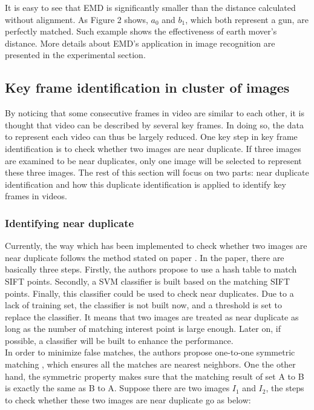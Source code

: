 \noindent It is easy to see that EMD is significantly smaller than the distance calculated without alignment. As Figure 2 shows, $a_0$ and $b_1$, which both represent a gun, are perfectly matched. Such example shows the effectiveness of earth mover's distance. More details about EMD's application in image recognition are presented in the experimental section.

\subsection {Key frame identification in cluster of images}
By noticing that some consecutive frames in video are similar to each other, it is thought that video can be described by several key frames. In doing so, the data to represent each video can thus be largely reduced. One key step in key frame identification is to check whether two images are near duplicate. If three images are examined to be near duplicates, only one image will be selected to represent these three images. The rest of this section will focus on two parts: near duplicate identification and how this duplicate identification is applied to identify key frames in videos.

\subsubsection{Identifying near duplicate}
Currently, the way which has been implemented to check whether two images are near duplicate follows the method stated on paper \cite{zhao2007near}. In the paper, there are basically three steps. Firstly, the authors propose to use a hash table to match SIFT points. Secondly, a SVM classifier is built based on the matching SIFT points. Finally, this classifier could be used to check near duplicates. Due to a lack of training set, the classifier is not built now, and a threshold is set to replace the classifier. It means that two images are treated as near duplicate as long as the number of matching interest point is large enough. Later on, if possible, a classifier will be built to enhance the performance. \\

\noindent In order to minimize false matches, the authors propose one-to-one symmetric matching \cite{zhao2007near}, which ensures all the matches are nearest neighbors. One the other hand, the symmetric property makes sure that the matching result of set A to B is exactly the same as B to A. Suppose there are two images $I_1$ and $I_2$, the steps to check whether these two images are near duplicate go as below:

